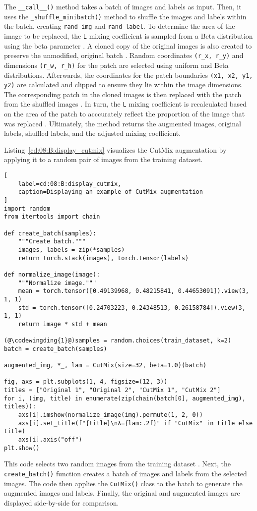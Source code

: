 The \lstinline{__call__()} method takes a batch of images and labels as input. 
Then, it uses the \lstinline{_shuffle_minibatch()} method to shuffle the images and labels within the batch, creating \lstinline{rand_img} and \lstinline{rand_label}. To determine the area of the image to be replaced, the \lstinline{L} mixing coefficient is sampled from a Beta distribution using the beta parameter . 
A cloned copy of the original images is also created to preserve the unmodified, original batch .
Random coordinates \lstinline{(r_x, r_y)} and dimensions \lstinline{(r_w, r_h)} for the patch are selected using uniform and Beta distributions. Afterwards, the coordinates for the patch boundaries \lstinline{(x1, x2, y1, y2)} are calculated and clipped to ensure they lie within the image dimensions.
The corresponding patch in the cloned images is then replaced with the patch from the shuffled images .
In turn, the \lstinline{L} mixing coefficient is recalculated based on the area of the patch to acccurately reflect the proportion of the image that was replaced .
Ultimately, the method returns the augmented images, original labels, shuffled labels, and the adjusted mixing coefficient.

Listing~\ref{cd:08:B:display_cutmix} visualizes the CutMix augmentation by applying it to a random pair of images from the training dataset.
\begin{lstlisting}[
    label=cd:08:B:display_cutmix,
    caption=Displaying an example of CutMix augmentation
]
import random
from itertools import chain

def create_batch(samples):
    """Create batch."""
    images, labels = zip(*samples)
    return torch.stack(images), torch.tensor(labels)

def normalize_image(image):
    """Normalize image."""
    mean = torch.tensor([0.49139968, 0.48215841, 0.44653091]).view(3, 1, 1)
    std = torch.tensor([0.24703223, 0.24348513, 0.26158784]).view(3, 1, 1)
    return image * std + mean

(@\codewingding{1}@)samples = random.choices(train_dataset, k=2)
batch = create_batch(samples)

augmented_img, *_, lam = CutMix(size=32, beta=1.0)(batch)

fig, axs = plt.subplots(1, 4, figsize=(12, 3))
titles = ["Original 1", "Original 2", "CutMix 1", "CutMix 2"]
for i, (img, title) in enumerate(zip(chain(batch[0], augmented_img), titles)):
    axs[i].imshow(normalize_image(img).permute(1, 2, 0))
    axs[i].set_title(f"{title}\nλ={lam:.2f}" if "CutMix" in title else title)
    axs[i].axis("off")
plt.show()
\end{lstlisting}
This code selects two random images from the training dataset . Next, the \lstinline{create_batch()} function creates a batch of images and labels from the selected images. The code then applies the \lstinline{CutMix()} class to the batch to generate the augmented images and labels. Finally, the original and augmented images are displayed side-by-side for comparison. 

